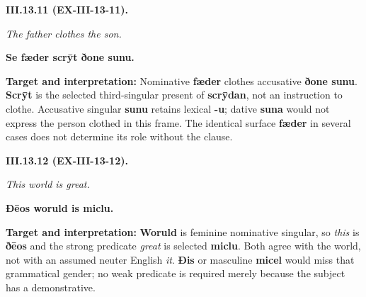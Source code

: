 \par\begin{minipage}{\linewidth}\raggedright
\textbf{III.13.11 (EX-III-13-11).}

\emph{The father clothes the son.}

\textbf{Se fæder scrȳt ðone sunu.}

\textbf{Target and interpretation:} Nominative \textbf{fæder} clothes accusative \textbf{ðone sunu}. \textbf{Scrȳt} is the selected third-singular present of \textbf{scrȳdan}, not an instruction to clothe. Accusative singular \textbf{sunu} retains lexical \textbf{-u}; dative \textbf{suna} would not express the person clothed in this frame. The identical surface \textbf{fæder} in several cases does not determine its role without the clause.

\end{minipage}\par\addvspace{4pt}

\par\begin{minipage}{\linewidth}\raggedright
\textbf{III.13.12 (EX-III-13-12).}

\emph{This world is great.}

\textbf{Ðēos woruld is miclu.}

\textbf{Target and interpretation:} \textbf{Woruld} is feminine nominative singular, so \emph{this} is \textbf{ðēos} and the strong predicate \emph{great} is selected \textbf{miclu}. Both agree with the world, not with an assumed neuter English \emph{it}. \textbf{Ðis} or masculine \textbf{micel} would miss that grammatical gender; no weak predicate is required merely because the subject has a demonstrative.

\end{minipage}\par\addvspace{4pt}

